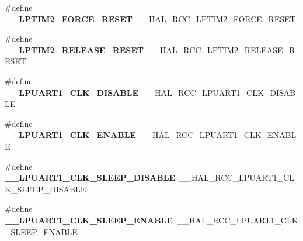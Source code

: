 \begin{DoxyCompactItemize}
\item 
\mbox{\label{group___h_a_l___r_c_c___aliased_ga65872113839cb5569f584e6373e2e006}} 
\#define {\bfseries \+\_\+\+\_\+\+L\+P\+T\+I\+M2\+\_\+\+F\+O\+R\+C\+E\+\_\+\+R\+E\+S\+ET}~\+\_\+\+\_\+\+H\+A\+L\+\_\+\+R\+C\+C\+\_\+\+L\+P\+T\+I\+M2\+\_\+\+F\+O\+R\+C\+E\+\_\+\+R\+E\+S\+ET
\item 
\mbox{\label{group___h_a_l___r_c_c___aliased_gadd807afbe3725b62026e46e99531efac}} 
\#define {\bfseries \+\_\+\+\_\+\+L\+P\+T\+I\+M2\+\_\+\+R\+E\+L\+E\+A\+S\+E\+\_\+\+R\+E\+S\+ET}~\+\_\+\+\_\+\+H\+A\+L\+\_\+\+R\+C\+C\+\_\+\+L\+P\+T\+I\+M2\+\_\+\+R\+E\+L\+E\+A\+S\+E\+\_\+\+R\+E\+S\+ET
\item 
\mbox{\label{group___h_a_l___r_c_c___aliased_gaed58b8ae517de9035a76e9c804087fa6}} 
\#define {\bfseries \+\_\+\+\_\+\+L\+P\+U\+A\+R\+T1\+\_\+\+C\+L\+K\+\_\+\+D\+I\+S\+A\+B\+LE}~\+\_\+\+\_\+\+H\+A\+L\+\_\+\+R\+C\+C\+\_\+\+L\+P\+U\+A\+R\+T1\+\_\+\+C\+L\+K\+\_\+\+D\+I\+S\+A\+B\+LE
\item 
\mbox{\label{group___h_a_l___r_c_c___aliased_ga31a3336329cc12613dc4741af218dcca}} 
\#define {\bfseries \+\_\+\+\_\+\+L\+P\+U\+A\+R\+T1\+\_\+\+C\+L\+K\+\_\+\+E\+N\+A\+B\+LE}~\+\_\+\+\_\+\+H\+A\+L\+\_\+\+R\+C\+C\+\_\+\+L\+P\+U\+A\+R\+T1\+\_\+\+C\+L\+K\+\_\+\+E\+N\+A\+B\+LE
\item 
\mbox{\label{group___h_a_l___r_c_c___aliased_ga932fe128bb4feb05c8feec3783e08499}} 
\#define {\bfseries \+\_\+\+\_\+\+L\+P\+U\+A\+R\+T1\+\_\+\+C\+L\+K\+\_\+\+S\+L\+E\+E\+P\+\_\+\+D\+I\+S\+A\+B\+LE}~\+\_\+\+\_\+\+H\+A\+L\+\_\+\+R\+C\+C\+\_\+\+L\+P\+U\+A\+R\+T1\+\_\+\+C\+L\+K\+\_\+\+S\+L\+E\+E\+P\+\_\+\+D\+I\+S\+A\+B\+LE
\item 
\mbox{\label{group___h_a_l___r_c_c___aliased_gac9485ddfd5a22a336990ed612758384e}} 
\#define {\bfseries \+\_\+\+\_\+\+L\+P\+U\+A\+R\+T1\+\_\+\+C\+L\+K\+\_\+\+S\+L\+E\+E\+P\+\_\+\+E\+N\+A\+B\+LE}~\+\_\+\+\_\+\+H\+A\+L\+\_\+\+R\+C\+C\+\_\+\+L\+P\+U\+A\+R\+T1\+\_\+\+C\+L\+K\+\_\+\+S\+L\+E\+E\+P\+\_\+\+E\+N\+A\+B\+LE
\item 
\mbox{\label{group___h_a_l___r_c_c___aliased_gaee163600587d77d2a199481ca6935c1b}} 

\end{DoxyCompactItemize}
